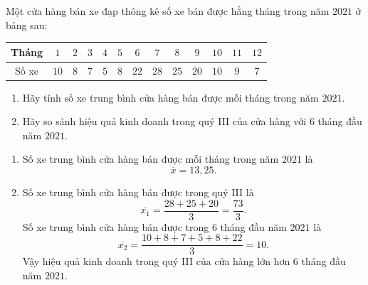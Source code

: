 \begin{bt}%
	Một cửa hàng bán xe đạp thông kê số xe bán được hằng tháng trong năm $2021$ ở bảng sau:\\
	\begin{center}
		\begin{tabular}{|c|c|c|c|c|c|c|c|c|c|c|c|c|}
			\hline
			Tháng	& $1$ & $2$ &$3$ & $4$ & $5$ &$6$ & $7$ & $8$ &$9$ & $10$ & $11$ &$12$ \\
			\hline
			Số xe	& $10$ & $8$ & $7$ & $5$ & $8$ &$22$& $28$ & $25$ &$20$& $10$ & $9$ &$7$ \\
			\hline
		\end{tabular}  
	\end{center}
	
	\begin{enumerate}
		\item Hãy tính số xe trung bình cửa hàng bán được mỗi tháng trong năm $2021$.
		\item Hãy so sánh hiệu quả kinh doanh trong quý III của cửa hàng với $6$ tháng đầu năm $2021$.
	\end{enumerate}
	\loigiai
	{
		\begin{enumerate}
			\item Số xe trung bình cửa hàng bán được mỗi tháng trong năm $2021$ là $$\overline{x}=13{,}25.$$
			\item  Số xe trung bình cửa hàng bán được trong quý III là $$\overline{x_1}=\dfrac{28+25+20}{3}=\dfrac{73}{3}.$$
			Số xe trung bình cửa hàng bán được trong $6$ tháng đầu năm $2021$ là $$\overline{x_2}=\dfrac{10+8+7+5+8+22}{3}=10.$$
			Vậy hiệu quả kinh doanh trong quý III của cửa hàng lớn hơn $6$ tháng đầu năm $2021$.
		\end{enumerate}		
	}
\end{bt}

